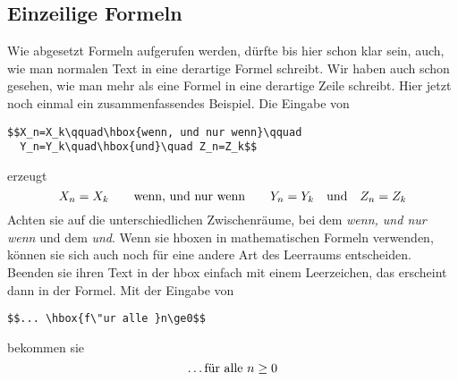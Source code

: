\subsection{Einzeilige Formeln}
Wie abgesetzt Formeln aufgerufen werden, d\"urfte bis hier schon klar
sein, auch, wie man normalen Text in eine derartige Formel schreibt.
Wir haben auch schon gesehen, wie man mehr als eine Formel in eine
derartige Zeile schreibt. Hier jetzt noch einmal ein zusammenfassendes
Beispiel. Die Eingabe von
\begin{verbatim}
$$X_n=X_k\qquad\hbox{wenn, und nur wenn}\qquad
  Y_n=Y_k\quad\hbox{und}\quad Z_n=Z_k$$
\end{verbatim}
erzeugt
$$X_n=X_k\qquad\hbox{wenn, und nur wenn}\qquad
  Y_n=Y_k\quad\hbox{und}\quad Z_n=Z_k$$
Achten sie auf die unterschiedlichen 
Zwischenr\"aume, bei dem {\em wenn,
und nur wenn} und dem {\em und}. Wenn sie 
hboxen in mathematischen
Formeln verwenden, k\"onnen sie sich auch noch f\"ur eine andere Art des
Leerraums entscheiden. Beenden sie ihren Text in der hbox einfach mit
einem 
Leerzeichen, das erscheint dann in der Formel. Mit der Eingabe
von
\begin{verbatim}
$$... \hbox{f\"ur alle }n\ge0$$
\end{verbatim}
bekommen sie
$$\ldots\hbox{f\"ur alle }n\ge0$$


